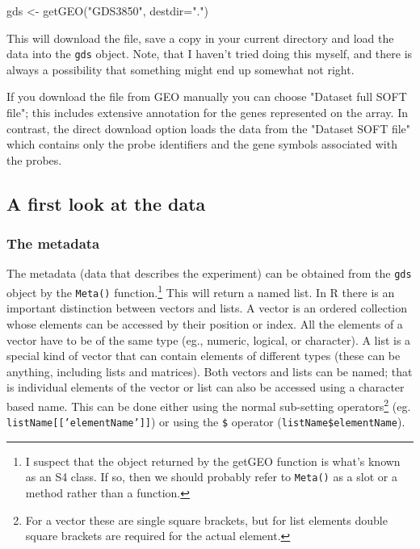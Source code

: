 \documentclass[11pt]{article}
\begin{document}
\begin{rcode}
  gds <- getGEO("GDS3850", destdir=".")
\end{rcode}
This will download the file, save a copy in your current directory
and load the data into the \texttt{gds} object. Note, that I haven't
tried doing this myself, and there is always a possibility that something
might end up somewhat not right.

If you download the file from GEO manually you can choose "Dataset full SOFT file";
this includes extensive annotation for the genes represented on the array.
In contrast, the direct download option loads the data from the "Dataset SOFT file"
which contains only the probe identifiers and the gene symbols associated
with the probes.

\subsection{A first look at the data}
\label{sec-1-2}
\subsubsection{The metadata}
\label{sec-1-2-1}
The metadata (data that describes the experiment) can be obtained from the
\texttt{gds} object by the \texttt{Meta()} function.\footnote{I suspect that
the object returned by the getGEO function is what's known as an S4 class.
If so, then we should probably refer to \texttt{Meta()} as a slot or a method
rather than a function.} This will return a named list. In R there is
an important distinction between vectors and lists. A vector is an ordered
collection whose elements can be accessed by their position or index. All
the elements of a vector have to be of the same type (eg., numeric, logical,
or character). A list is a special kind of vector that can contain
elements of different types (these can be anything, including lists and matrices).
Both vectors and lists can be named; that is individual elements of the vector
or list can also be accessed using a character based name. This can be done
either using the normal sub-setting operators\footnote{For a vector these are
single square brackets, but for list elements double square brackets are required
for the actual element.} (eg. \texttt{listName[['elementName']]}) or
using the \texttt{\$} operator (\texttt{listName\$elementName}).
\end{document}

